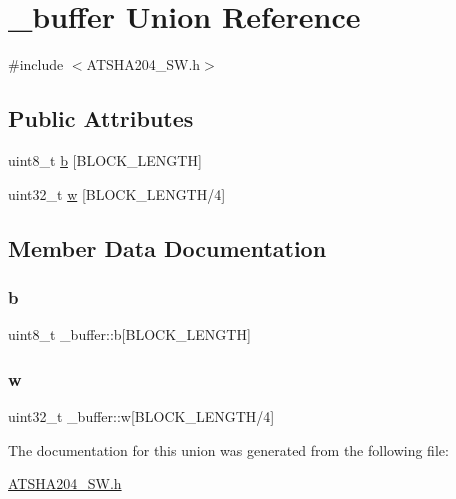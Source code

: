 \hypertarget{union__buffer}{}\section{\+\_\+buffer Union Reference}
\label{union__buffer}


{\ttfamily \#include $<$A\+T\+S\+H\+A204\+\_\+\+S\+W.\+h$>$}

\subsection*{Public Attributes}
\begin{DoxyCompactItemize}
\item 
uint8\+\_\+t \hyperlink{union__buffer_af9a64f686437353ef60bca8058f8ca02}{b} \mbox{[}B\+L\+O\+C\+K\+\_\+\+L\+E\+N\+G\+TH\mbox{]}
\item 
uint32\+\_\+t \hyperlink{union__buffer_af70a77ad023b0bc8b7bb870454272aa4}{w} \mbox{[}B\+L\+O\+C\+K\+\_\+\+L\+E\+N\+G\+TH/4\mbox{]}
\end{DoxyCompactItemize}


\subsection{Member Data Documentation}
\mbox{\label{union__buffer_af9a64f686437353ef60bca8058f8ca02}} 
\subsubsection{\texorpdfstring{b}{b}}
{\footnotesize\ttfamily uint8\+\_\+t \+\_\+buffer\+::b\mbox{[}B\+L\+O\+C\+K\+\_\+\+L\+E\+N\+G\+TH\mbox{]}}

\mbox{\label{union__buffer_af70a77ad023b0bc8b7bb870454272aa4}} 
\subsubsection{\texorpdfstring{w}{w}}
{\footnotesize\ttfamily uint32\+\_\+t \+\_\+buffer\+::w\mbox{[}B\+L\+O\+C\+K\+\_\+\+L\+E\+N\+G\+TH/4\mbox{]}}



The documentation for this union was generated from the following file\+:\begin{DoxyCompactItemize}
\item 
\hyperlink{ATSHA204__SW_8h}{A\+T\+S\+H\+A204\+\_\+\+S\+W.\+h}\end{DoxyCompactItemize}

